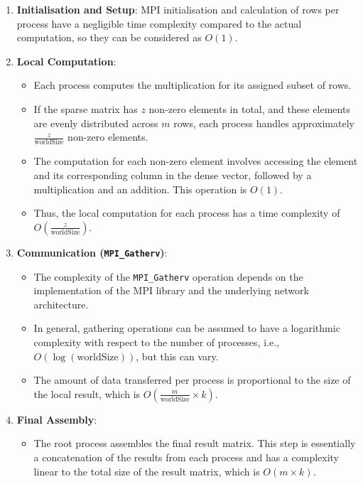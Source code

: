 \documentclass[12pt,oneside]{book} %
\begin{document}
\begin{enumerate}
    \item \textbf{Initialisation and Setup}:
          MPI initialisation and calculation of rows per process have a negligible time
          complexity compared to the actual computation, so they can be considered as \(
          O(1) \).

    \item \textbf{Local Computation}:
          \begin{itemize}
              \item Each process computes the multiplication for its assigned subset of rows.
              \item If the sparse matrix has \( z \) non-zero elements in total, and these elements
                    are evenly distributed across \( m \) rows, each process handles approximately
                    \( \frac{z}{\text{worldSize}} \) non-zero elements.
              \item The computation for each non-zero element involves accessing the element and
                    its corresponding column in the dense vector, followed by a multiplication and
                    an addition. This operation is \( O(1) \).
              \item Thus, the local computation for each process has a time complexity of \(
                    O\left(\frac{z}{\text{worldSize}}\right) \).
          \end{itemize}

    \item \textbf{Communication (\texttt{MPI\_Gatherv})}:
          \begin{itemize}
              \item The complexity of the \texttt{MPI\_Gatherv} operation depends on the
                    implementation of the MPI library and the underlying network architecture.
              \item In general, gathering operations can be assumed to have a logarithmic
                    complexity with respect to the number of processes, i.e., \(
                    O(\log(\text{worldSize})) \), but this can vary.
              \item The amount of data transferred per process is proportional to the size of the
                    local result, which is \( O\left(\frac{m}{\text{worldSize}} \times k\right) \).
          \end{itemize}

    \item \textbf{Final Assembly}:
          \begin{itemize}
              \item The root process assembles the final result matrix. This step is essentially a
                    concatenation of the results from each process and has a complexity linear to
                    the total size of the result matrix, which is \( O(m \times k) \).
          \end{itemize}
\end{enumerate}
\end{document}
